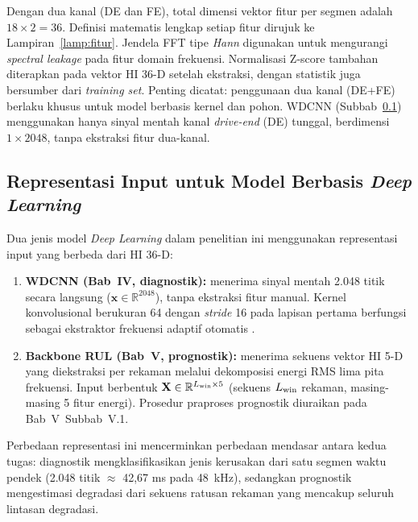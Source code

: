 Dengan dua kanal (DE dan FE), total dimensi vektor fitur per segmen adalah
$18 \times 2 = 36$. Definisi matematis lengkap setiap fitur dirujuk ke
Lampiran~\ref{lamp:fitur}. Jendela FFT tipe \emph{Hann} digunakan
untuk mengurangi \emph{spectral leakage} pada fitur domain frekuensi.
Normalisasi Z-score tambahan diterapkan pada vektor HI 36-D setelah
ekstraksi, dengan statistik juga bersumber dari \emph{training set}.
{\color{blue}Penting dicatat: penggunaan dua kanal (DE+FE) berlaku
khusus untuk model berbasis kernel dan pohon. WDCNN (Subbab~\ref{subsec:bab3_input_deep})
menggunakan hanya sinyal mentah kanal \emph{drive-end} (DE) tunggal,
berdimensi $1 \times 2048$, tanpa ekstraksi fitur dua-kanal.}%

\subsection{Representasi Input untuk Model Berbasis \emph{Deep Learning}}
\label{subsec:bab3_input_deep}

Dua jenis model \emph{Deep Learning} dalam penelitian ini menggunakan representasi
input yang berbeda dari HI 36-D:

\begin{enumerate}
  \item \textbf{WDCNN (Bab~IV, {\color{blue}diagnostik}):} menerima sinyal mentah 2.048 titik
        secara langsung ($\mathbf{x} \in \mathbb{R}^{2048}$), tanpa ekstraksi
        fitur manual. Kernel konvolusional berukuran 64 dengan \emph{stride}
        16 pada lapisan pertama berfungsi sebagai ekstraktor frekuensi adaptif
        otomatis .
  \item \textbf{Backbone RUL (Bab~V, {\color{blue}prognostik}):} menerima sekuens vektor
        HI 5-D yang diekstraksi per rekaman melalui dekomposisi energi RMS
        lima pita frekuensi. Input berbentuk
        $\mathbf{X} \in \mathbb{R}^{L_{\rm win} \times 5}$ (sekuens $L_{\rm win}$
        rekaman, masing-masing 5 fitur energi). Prosedur praproses prognostik
        diuraikan pada Bab~V~Subbab~V.1.
\end{enumerate}

Perbedaan representasi ini mencerminkan perbedaan mendasar antara kedua tugas:
diagnostik mengklasifikasikan jenis kerusakan dari satu segmen waktu pendek
(2.048 titik $\approx$ 42,67 ms pada 48~kHz), sedangkan prognostik mengestimasi
degradasi dari sekuens ratusan rekaman yang mencakup seluruh lintasan degradasi.


